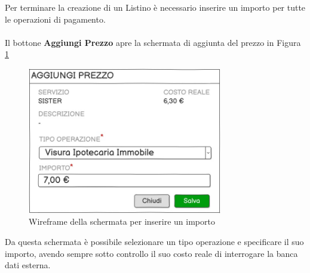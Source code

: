 Per terminare la creazione di un Listino \`e necessario inserire un importo per tutte le operazioni di pagamento.
\\\\
Il bottone \textbf{Aggiungi Prezzo} apre la schermata di aggiunta del prezzo in Figura \ref{aggiungiprezzo}
\begin{figure}[H]
  \centering
  \includegraphics[width=8.5cm]{images/gestione-listini/aggiungi-prezzo.png}
  \caption{Wireframe della schermata per inserire un importo}
  \label{aggiungiprezzo}
\end{figure}

Da questa schermata \`e possibile selezionare un tipo operazione e specificare il suo importo, avendo sempre sotto controllo il suo costo reale di interrogare la banca dati esterna.
